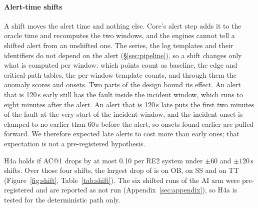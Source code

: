 \paragraph{Alert-time shifts}
A shift moves the alert time and nothing else.
Core's alert step adds it to the oracle time and recomputes the two windows, and the engines cannot tell a shifted alert from an unshifted one.
The series, the log templates and their identifiers do not depend on the alert (\S\ref{sec:pipeline}), so a shift changes only what is computed per window: which points count as baseline, the edge and critical-path tables, the per-window template counts, and through them the anomaly scores and onsets.
Two parts of the design bound its effect.
An alert that is 120\,s early still has the fault inside the incident window, which runs to eight minutes after the alert.
An alert that is 120\,s late puts the first two minutes of the fault at the very start of the incident window, and the incident onset is clamped to no earlier than 60\,s before the alert, so onsets found earlier are pulled forward.
We therefore expected late alerts to cost more than early ones; that expectation is not a pre-registered hypothesis.

H4a holds if AC@1 drops by at most 0.10 per RE2 system under $\pm 60$ and $\pm 120$\,s shifts.
Over those four shifts, the largest drop of  is  on OB,  on SS and  on TT (Figure~\ref{fig:shift}, Table~\ref{tab:shift}).
The six shifted runs of the AI arm were pre-registered and are reported as not run (Appendix~\ref{sec:appendix}), so H4a is tested for the deterministic path only.

